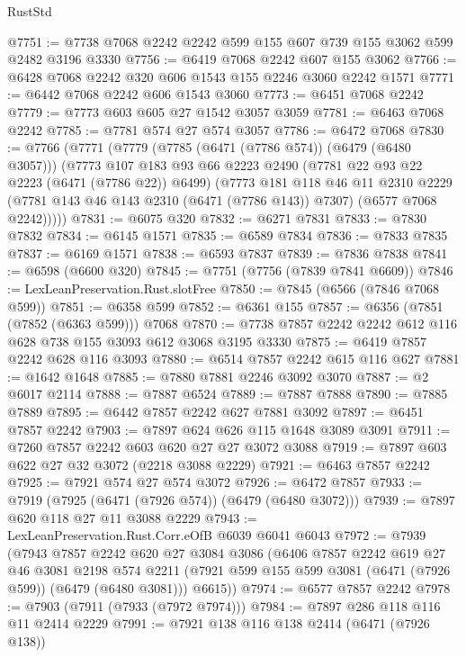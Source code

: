 \begin{lexlean}{RustStd}
\begin{coremodule}
@7751 := @7738 @7068 @2242 @2242 @599 @155 @607 @739 @155 @3062 @599 @2482 @3196 @3330
@7756 := @6419 @7068 @2242 @607 @155 @3062
@7766 := @6428 @7068 @2242 @320 @606 @1543 @155 @2246 @3060 @2242 @1571
@7771 := @6442 @7068 @2242 @606 @1543 @3060
@7773 := @6451 @7068 @2242
@7779 := @7773 @603 @605 @27 @1542 @3057 @3059
@7781 := @6463 @7068 @2242
@7785 := @7781 @574 @27 @574 @3057
@7786 := @6472 @7068
@7830 := @7766
    (@7771
      (@7779
        (@7785 (@6471 (@7786 @574)) (@6479 (@6480 @3057)))
        (@7773
          @107
          @183
          @93
          @66
          @2223
          @2490
          (@7781 @22 @93 @22 @2223 (@6471 (@7786 @22)) @6499)
          (@7773
            @181
            @118
            @46
            @11
            @2310
            @2229
            (@7781 @143 @46 @143 @2310 (@6471 (@7786 @143)) @7307)
            (@6577 @7068 @2242)))))
@7831 := @6075 @320
@7832 := @6271 @7831
@7833 := @7830 @7832
@7834 := @6145 @1571
@7835 := @6589 @7834
@7836 := @7833 @7835
@7837 := @6169 @1571
@7838 := @6593 @7837
@7839 := @7836 @7838
@7841 := @6598 (@6600 @320)
@7845 := @7751 (@7756 (@7839 @7841 @6609))
@7846 := LexLeanPreservation.Rust.slotFree
@7850 := @7845 (@6566 (@7846 @7068 @599))
@7851 := @6358 @599
@7852 := @6361 @155
@7857 := @6356 (@7851 (@7852 (@6363 @599))) @7068
@7870 := @7738 @7857 @2242 @2242 @612 @116 @628 @738 @155 @3093 @612 @3068 @3195 @3330
@7875 := @6419 @7857 @2242 @628 @116 @3093
@7880 := @6514 @7857 @2242 @615 @116 @627
@7881 := @1642 @1648
@7885 := @7880 @7881 @2246 @3092 @3070
@7887 := @2 @6017 @2114
@7888 := @7887 @6524
@7889 := @7887 @7888
@7890 := @7885 @7889
@7895 := @6442 @7857 @2242 @627 @7881 @3092
@7897 := @6451 @7857 @2242
@7903 := @7897 @624 @626 @115 @1648 @3089 @3091
@7911 := @7260 @7857 @2242 @603 @620 @27 @27 @3072 @3088
@7919 := @7897 @603 @622 @27 @32 @3072 (@2218 @3088 @2229)
@7921 := @6463 @7857 @2242
@7925 := @7921 @574 @27 @574 @3072
@7926 := @6472 @7857
@7933 := @7919 (@7925 (@6471 (@7926 @574)) (@6479 (@6480 @3072)))
@7939 := @7897 @620 @118 @27 @11 @3088 @2229
@7943 := LexLeanPreservation.Rust.Corr.eOfB @6039 @6041 @6043
@7972 := @7939
    (@7943
      @7857
      @2242
      @620
      @27
      @3084
      @3086
      (@6406
        @7857
        @2242
        @619
        @27
        @46
        @3081
        @2198
        @574
        @2211
        (@7921 @599 @155 @599 @3081 (@6471 (@7926 @599)) (@6479 (@6480 @3081)))
        @6615))
@7974 := @6577 @7857 @2242
@7978 := @7903 (@7911 (@7933 (@7972 @7974)))
@7984 := @7897 @286 @118 @116 @11 @2414 @2229
@7991 := @7921 @138 @116 @138 @2414 (@6471 (@7926 @138))

\end{coremodule}
\end{lexlean}
